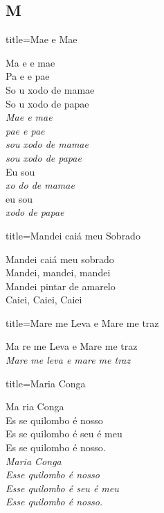 \documentclass[fontsize=14pt, twoside]{scrreprt}
\newcommand\chapTOC[1]{
    \chapter*{#1}
    \addcontentsline{toc}{chapter}{#1}
    \markboth{#1}{#1}}
\begin{document}
\begin{multicols*}{2}
\chapTOC{M}

\begin{song}{title={Mae e Mae}}
        \begin{verse*}
            Ma e e mae\\
            Pa e e pae\\
            So u xodo de mamae\\
            So u xodo de papae\\
            \textit{Mae e mae}\\
            \textit{pae e pae}\\
            \textit{sou xodo de mamae}\\
            \textit{sou xodo de papae}\\
            Eu sou\\
            \textit{xo}  \textit{do de mamae}\\
            eu sou\\
            \textit{xodo de papae}\\
        \end{verse*}
\end{song}

\begin{song}{title={Mandei caiá meu Sobrado}}
    \begin{verse*}
            Mandei caiá meu sobrado \\
            Mandei, mandei, mandei\\
            Mandei pintar de amarelo\\
            Caiei, Caiei, Caiei\\
    \end{verse*}
        
\end{song}
\begin{song}{title={Mare me Leva e Mare me traz}}
        \begin{verse*}
            Ma re me Leva e Mare me traz\\
            \textit{Mare me leva e mare me traz}\\
        \end{verse*}
\end{song}

\begin{song}{title={Maria Conga}}
        \begin{verse*}
            Ma ria Conga\\
            Es se quilombo é nosso\\
            Es se quilombo é seu é meu\\
            Es se quilombo é nosso.\\
            \textit{Maria Conga}\\
            \textit{Esse quilombo é nosso}\\
            \textit{Esse quilombo é seu é meu}\\
            \textit{Esse quilombo é nosso.}\\
        \end{verse*}
\end{song}


\end{multicols*}
\end{document}
